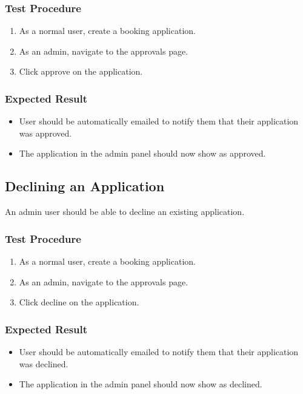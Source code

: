 \documentclass[a4paper, draft]{article}
\begin{document}
\subsubsection{Test Procedure}
\begin{enumerate}
    \item As a normal user, create a booking application.
    \item As an admin, navigate to the approvals page.
    \item Click approve on the application.
\end{enumerate}

\subsubsection{Expected Result}
\begin{itemize}
    \item User should be automatically emailed to notify them that their application was approved.
    \item The application in the admin panel should now show as approved.
\end{itemize}

\subsection{Declining an Application}
An admin user should be able to decline an existing application.

\subsubsection{Test Procedure}
\begin{enumerate}
    \item As a normal user, create a booking application.
    \item As an admin, navigate to the approvals page.
    \item Click decline on the application.
\end{enumerate}

\subsubsection{Expected Result}
\begin{itemize}
    \item User should be automatically emailed to notify them that their application was declined.
    \item The application in the admin panel should now show as declined.
\end{itemize}
\end{document}
